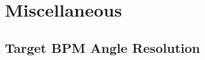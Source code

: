 \chapter{Miscellaneous}
\label{Miscellaneous}

\section{Target BPM Angle Resolution}
\label{Target BPM Angle Resolution 2}

%
%
%
%
%
%



